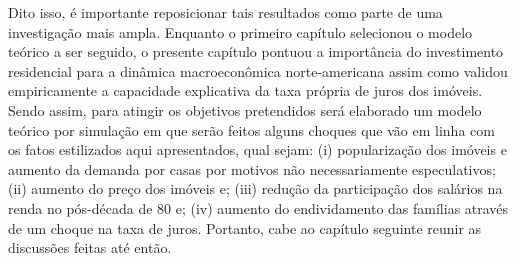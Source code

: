 Dito isso, é importante reposicionar tais resultados como parte de uma investigação mais ampla.
Enquanto o primeiro capítulo selecionou o modelo teórico a ser seguido, o presente capítulo pontuou a importância do investimento residencial para a dinâmica macroeconômica norte-americana assim como validou empiricamente a capacidade explicativa da taxa própria de juros dos imóveis.
Sendo assim, para atingir os objetivos pretendidos será elaborado um modelo teórico por simulação em que serão feitos alguns choques que vão em linha com os fatos estilizados aqui apresentados, qual sejam:
(i) popularização dos imóveis e aumento da demanda por casas por motivos não necessariamente especulativos;
(ii) aumento do preço dos imóveis e;
(iii) redução da participação dos salários na renda no pós-década de 80 e;
(iv) aumento do endividamento das famílias através de um choque na taxa de juros.
Portanto, cabe ao capítulo seguinte reunir as discussões feitas até então.



